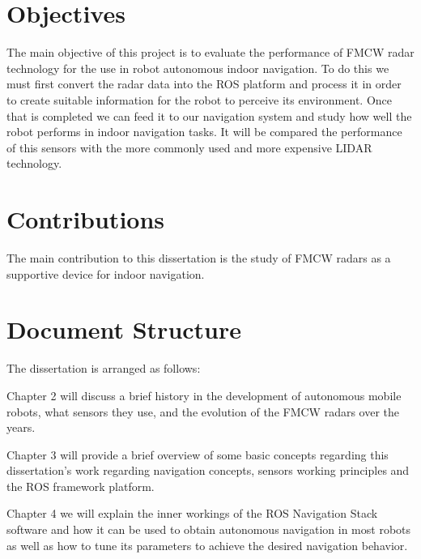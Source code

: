 \section{Objectives}
The main objective of this project is to evaluate the performance of \ac{FMCW} radar technology for the use in robot autonomous indoor navigation. To do this we must first convert the radar data into the \ac{ROS} platform and process it in order to create suitable information for the robot to perceive its environment. Once that is completed we can feed it to our navigation system and study how well the robot performs in indoor navigation tasks.
It will be compared the performance of this sensors with the more commonly used and more expensive \ac{LIDAR} technology.

\section{Contributions}
The main contribution to this dissertation is the study of \ac{FMCW} radars as a supportive device for indoor navigation.
\section{Document Structure}
The dissertation is arranged as follows:

Chapter 2 will discuss a brief history in the development of autonomous mobile robots, what sensors they use, and the evolution of the \ac{FMCW} radars over the years.

Chapter 3 will provide a brief overview of some basic concepts regarding this dissertation's work regarding navigation concepts, sensors working principles and the ROS framework platform.


Chapter 4 we will explain the inner workings of the ROS Navigation Stack software and how it can be used to obtain autonomous navigation in most robots as well as how to tune its parameters to achieve the desired navigation behavior.




